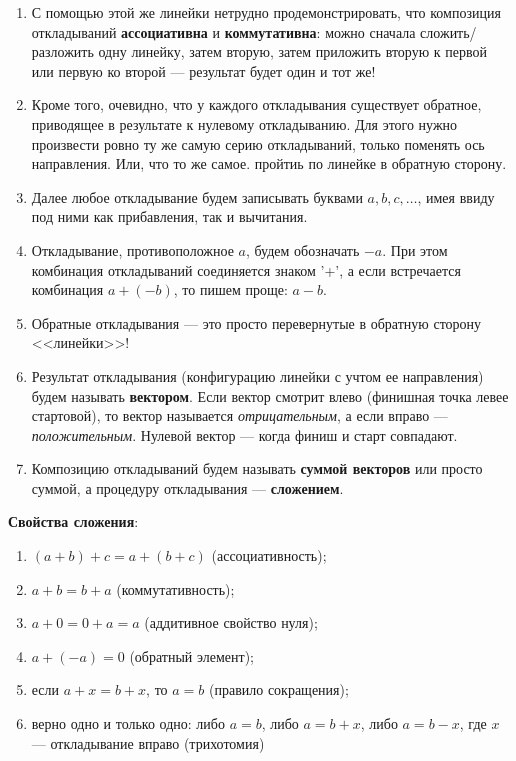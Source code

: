 \begin{enumerate}\setlength{\itemsep}{1pt}\setcounter{enumi}{7}
\item С помощью этой же линейки нетрудно продемонстрировать, что композиция откладываний \textbf{ассоциативна} и \textbf{коммутативна}: можно сначала сложить/разложить одну линейку, затем вторую, затем приложить вторую к первой или первую ко второй --- результат будет один и тот же!
\item Кроме того, очевидно, что у каждого откладывания существует обратное, приводящее в результате к нулевому откладыванию. Для этого нужно произвести ровно ту же самую серию откладываний, только поменять ось направления. Или, что то же самое. пройтиь по линейке в обратную сторону.
\item Далее любое откладывание будем записывать буквами $a,b,c,\dots$, имея ввиду под ними как прибавления, так и вычитания.
\item Откладывание, противоположное $a$, будем обозначать $-a$. При этом комбинация откладываний соединяется знаком '+', а если встречается комбинация $a+(-b)$, то пишем проще: $a-b$.
\item Обратные откладывания --- это просто перевернутые в обратную сторону <<линейки>>!
\item Результат откладывания (конфигурацию линейки с учтом ее направления) будем называть \textbf{вектором}. Если вектор смотрит влево (финишная точка левее стартовой), то вектор называется \textit{отрицательным}, а если вправо --- \textit{положительным}. Нулевой вектор --- когда финиш и старт совпадают.
\item Композицию откладываний будем называть \textbf{суммой векторов} или просто суммой, а процедуру откладывания --- \textbf{сложением}.
\end{enumerate}

\textbf{Свойства сложения}:
\begin{enumerate}[SUM1]
\item $(a+b)+c=a+(b+c)$ (ассоциативность);
\item $a+b=b+a$ (коммутативность);
\item $a+0=0+a=a$ (аддитивное свойство нуля);
\item $a+(-a)=0$ (обратный элемент);
\item если $a+x=b+x$, то $a=b$ (правило сокращения);
\item верно одно и только одно: либо $a=b$, либо $a=b+x$, либо $a=b-x$, где $x$ --- откладывание вправо (трихотомия)
\end{enumerate}
